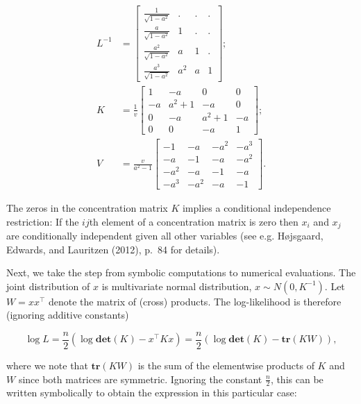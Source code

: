 \begin{align} 
    L^{-1} &= \left[\begin{matrix}\frac{1}{\sqrt{1 - a^{2}}} & . & . & .\\\frac{a}{\sqrt{1 - a^{2}}} & 1 & . & .\\\frac{a^{2}}{\sqrt{1 - a^{2}}} & a & 1 & .\\\frac{a^{3}}{\sqrt{1 - a^{2}}} & a^{2} & a & 1\end{matrix}\right] ; \\ 
    K &= \frac{1}{v}  \left[\begin{matrix}1 & - a & 0 & 0\\- a & a^{2} + 1 & - a & 0\\0 & - a & a^{2} + 1 & - a\\0 & 0 & - a & 1\end{matrix}\right] ; \\ 
    V &= \frac{v}{a^{2} - 1}  \left[\begin{matrix}-1 & - a & - a^{2} & - a^{3}\\- a & -1 & - a & - a^{2}\\- a^{2} & - a & -1 & - a\\- a^{3} & - a^{2} & - a & -1\end{matrix}\right]  .
  \end{align}

The zeros in the concentration matrix \(K\) implies a conditional
independence restriction: If the \(ij\)th element of a concentration
matrix is zero then \(x_i\) and \(x_j\) are conditionally independent
given all other variables (see e.g. Højsgaard, Edwards, and Lauritzen (2012), p.~84 for
details).

Next, we take the step from symbolic computations to numerical
evaluations. The joint distribution of \(x\) is multivariate normal
distribution, \(x\sim N(0, K^{-1})\). Let \(W=x x^\top\) denote the
matrix of (cross) products. The log-likelihood is therefore (ignoring
additive constants)

\begin{equation}
\log L = \frac n 2 (\log \mathbf{det}(K) - x^\top K x) = \frac n 2 (\log \mathbf{det}(K) - \mathbf{tr}(K W)), 
\end{equation}

where we note that \(\mathbf{tr}(KW)\) is the
sum of the elementwise products of \(K\) and \(W\) since both matrices are
symmetric. Ignoring the constant \(\frac n 2\),
this can be written symbolically to obtain the expression in
this particular case:


